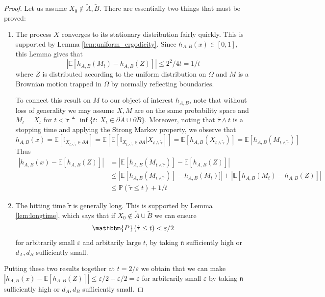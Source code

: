 \documentclass[english, aip, jcp, priprint, graphicx,floatfix]{revtex4-1}
\theoremstyle{plain}
\theoremstyle{definition}
\theoremstyle{plain}
\newcommand{\dimension}{{\mathfrak{n}}}
\newcommand{\indicatorf}[1]{\mathbb{I}_{#1}}
\begin{document}
\begin{proof}
Let us assume $X_0 \notin \tilde A,\tilde B$.  There are essentially two things that must be proved:
\begin{enumerate}
\item The process $X$ converges to its stationary distribution fairly quickly.  This is supported by Lemma \ref{lem:uniform_ergodicity}.  Since $h_{A,B}(x) \in [0,1]$, this Lemma gives that
%
\[
|\mathbb{E}[h_{A,B}(M_t)-h_{A,B}(Z)]| \leq 2^2/4t =1/t
\]
%
where $Z$ is distributed according to the uniform distribution on $\Omega$ and $M$ is a Brownian motion trapped in $\Omega$ by normally reflecting boundaries.  

To connect this result on $M$ to our object of interest $h_{A,B}$, note that without loss of generality we may assume $X,M$ are on the same probability space and $M_t=X_t$ for $t<\tilde\tau \triangleq \inf \{t:\ X_t \in \partial \dot A \cup \partial \dot B\}$.  Moreover, noting that $\tilde\tau\wedge t$ is a stopping time and applying the Strong Markov property, we observe that 
%
\[
h_{A,B}(x) = \mathbb{E} [\indicatorf{X_{t\wedge\tilde\tau} \in \partial A}] 
        = \mathbb{E} [\mathbb{E}[\indicatorf{X_{t\wedge\tilde\tau} \in \partial A} | X_{t\wedge\tilde\tau}]]
        = \mathbb{E} [h_{A,B}(X_{t\wedge\tilde\tau})] = \mathbb{E} [h_{A,B}(M_{t\wedge\tilde\tau})]
\]
%
Thus
\begin{align*}
|h_{A,B}(x) - \mathbb{E}[h_{A,B}(Z)]| &= |\mathbb{E} [h_{A,B}(M_{t\wedge\tilde\tau})] - \mathbb{E}[h_{A,B}(Z)]|\\
&\leq |\mathbb{E} [h_{A,B}(M_{t\wedge\tilde\tau})] - h_{A,B}(M_t)]| + |\mathbb{E} [h_{A,B}(M_{t}) - h_{A,B}(Z)]|\\
&\leq \mathbb{P}(\tilde \tau \leq t) + 1/t
\end{align*}
%

\item The hitting time $\tilde \tau$ is generally long.  This is supported by Lemma \ref{lem:longtime}, which says that if $X_0 \not\in\tilde{A} \cup \tilde{B}$ we can ensure
%
\[
\mathbbm{P} \left( \tilde{\tau} \leq t \right) < \varepsilon/2
\]
%
for arbitrarily small $\varepsilon$ and arbitarily large $t$, by taking $\dimension$ sufficiently high or $d_A,d_B$ sufficiently small.
\end{enumerate}
Putting these two results together at $t=2/\varepsilon$ we obtain that we can make $|h_{A,B}(x) - \mathbb{E}[h_{A,B}(Z)]| \leq \varepsilon / 2 + \varepsilon/2 = \varepsilon$ for arbitrarily small $\varepsilon$ by taking $\dimension$ sufficiently high or $d_A,d_B$ sufficiently small.
\end{proof}
\end{document}
